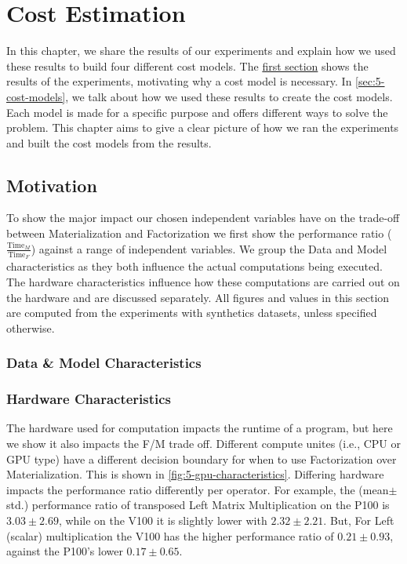 
\chapter{Cost Estimation}

\label{chapter:cost-estimation}
In this chapter, we share the results of our experiments and explain how we used these results to build four different cost models. The \hyperref[sec:5-motivation]{first section} shows the results of the experiments, motivating why a cost model is necessary. In \autoref{sec:5-cost-models}, we talk about how we used these results to create the cost models. Each model is made for a specific purpose and offers different ways to solve the problem. This chapter aims to give a clear picture of how we ran the experiments and built the cost models from the results.

\section{Motivation}
\label{sec:5-motivation}
To show the major impact our chosen independent variables have on the trade-off between Materialization and Factorization we first show the performance ratio ($\frac{\text{Time}_M}{\text{Time}_F}$) against a range of independent variables.
We group the Data and Model characteristics as they both influence the actual computations being executed. The hardware characteristics influence how these computations are carried out on the hardware and are discussed separately. All figures and values in this section are computed from the experiments with synthetics datasets, unless specified otherwise.

\subsection{Data \& Model Characteristics}


\subsection{Hardware Characteristics}
The hardware used for computation impacts the runtime of a program, but here we show it also impacts the F/M trade off. Different compute unites (i.e., CPU or GPU type) have a different decision boundary for when to use Factorization over Materialization. This is shown in \autoref{fig:5-gpu-characteristics}. Differing hardware impacts the performance ratio differently per operator. For example, the (mean$\pm$std.) performance ratio of transposed Left Matrix Multiplication on the P100 is $3.03\pm2.69$, while on the V100 it is slightly lower with $2.32\pm2.21$. But, For Left (scalar) multiplication the V100 has the higher performance ratio of $0.21\pm0.93$, against the P100's lower $0.17\pm0.65$.

